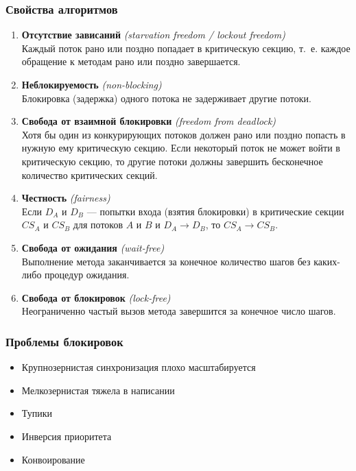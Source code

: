 \documentclass[aspectratio=169, pdf, 8pt, unicode]{beamer}
\begin{document}
\begin{frame}
\frametitle{Свойства алгоритмов}
\begin{enumerate}
\item \textbf{Отсутствие зависаний} \textit{(starvation freedom / lockout freedom)}\\
    Каждый поток рано или поздно попадает в критическую секцию, т.~е. каждое обращение к методам рано или поздно завершается.
\item \textbf{Неблокируемость} \textit{(non-blocking)}\\
    Блокировка (задержка) одного потока не задерживает другие потоки.
\item \textbf{Свобода от взаимной блокировки} \textit{(freedom from deadlock)}\\
    Хотя бы один из конкурирующих потоков должен рано или поздно попасть в нужную ему критическую секцию. Если некоторый поток не может войти в критическую секцию, то другие потоки должны завершить бесконечное количество критических секций.
\item \textbf{Честность} \textit{(fairness)}\\
    Если $D_A$ и $D_B$ --- попытки входа (взятия блокировки) в критические секции $CS_A$ и $CS_B$ для потоков $A$ и $B$ и $D_A \to D_B$, то
    $CS_A \to CS_B$.
\item \textbf{Свобода от ожидания} \textit{(wait-free)}\\
    Выполнение метода заканчивается за конечное количество шагов без каких-либо процедур ожидания.
\item \textbf{Свобода от блокировок} \textit{(lock-free)}\\
    Неограниченно частый вызов метода завершится за конечное число шагов.
\end{enumerate}
\end{frame}

\begin{frame}[fragile]
\frametitle{Проблемы блокировок}
\begin{itemize}
\setlength\itemsep{2em}
\item Крупнозернистая синхронизация плохо масштабируется
\item Мелкозернистая тяжела в написании
\item Тупики
\item Инверсия приоритета
\item Конвоирование
\end{itemize}
\end{frame}
\end{document}
